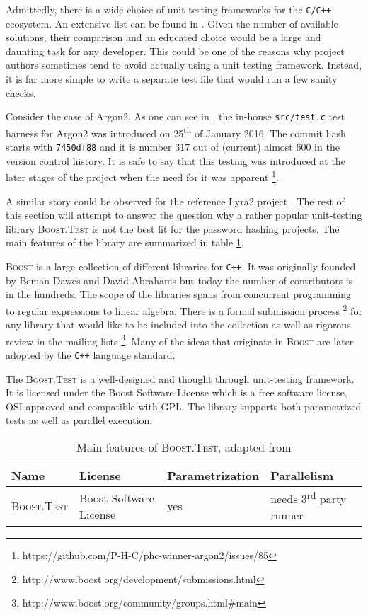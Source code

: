 Admittedly, there is a wide choice of unit testing frameworks for the \texttt{C/C++} ecosystem. An extensive list can be found in \cite{wiki:2017:frameworks-c, wiki:2017:frameworks-cpp}. Given the number of available solutions, their comparison and an educated choice would be a large and daunting task for any developer. This could be one of the reasons why project authors sometimes tend to avoid actually using a unit testing framework. Instead, it is far more simple to write a separate test file that would run a few sanity checks.

Consider the case of Argon2. As one can see in \cite{github:2017:argon2}, the in-house \texttt{src/test.c} test harness for Argon2 was introduced on 25\textsuperscript{th} of January 2016. The commit hash starts with \texttt{7450df88} and it is number 317 out of (current) almost 600 in the version control history. It is safe to say that this testing was introduced at the later stages of the project when the need for it was apparent \footnote{https://github.com/P-H-C/phc-winner-argon2/issues/85}.

A similar story could be observed for the reference Lyra2 project \cite{github:2017:lyra}. The rest of this section will attempt to answer the question why a rather popular unit-testing library \textsc{Boost.Test} is not the best fit for the password hashing projects. The main features of the library are summarized in table \ref{table:framework-features-cpp}.

\textsc{Boost} is a large collection of different libraries for \texttt{C++}. It was originally founded by Beman Dawes and David Abrahams but today the number of contributors is in the hundreds. The scope of the libraries spans from concurrent programming to regular expressions to linear algebra. There is a formal submission process \footnote{http://www.boost.org/development/submissions.html} for any library that would like to be included into the collection as well as rigorous review in the mailing lists \footnote{http://www.boost.org/community/groups.html\#main}. Many of the ideas that originate in \textsc{Boost} are later adopted by the \texttt{C++} language standard.

The \textsc{Boost.Test} is a well-designed and thought through unit-testing framework. It is licensed under the Boost Software License which is a free software license, OSI-approved and compatible with GPL. The library supports both parametrized tests as well as parallel execution.

\begin{table}
\begin{center}
\begin{tabular}{llll}
    Name & License & Parametrization & Parallelism \\ \hline
\textsc{Boost.Test} & Boost Software License & yes & needs 3\textsuperscript{rd} party runner
\end{tabular}
\end{center}
\caption{Main features of \textsc{Boost.Test}, adapted from \cite{wiki:2017:frameworks-cpp}}
\label{table:framework-features-cpp}
\end{table}

